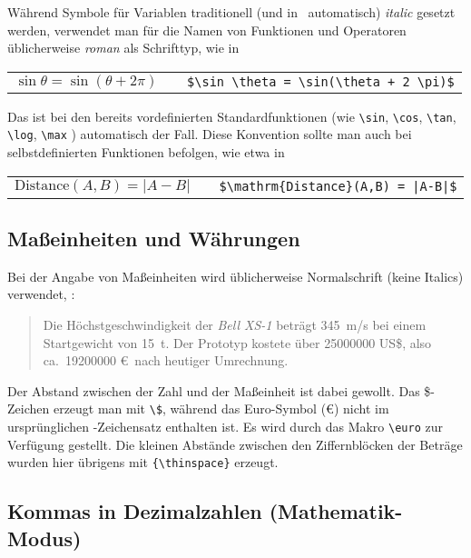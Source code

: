 Während Symbole für Variablen traditionell (und in \latex\ automatisch) \emph{italic} gesetzt werden,
verwendet man für die Namen von Funktionen und Operatoren üblicherweise
\emph{roman} als Schrifttyp, wie \zB in
\begin{center}
\begin{tabular}{lcl}
$\sin \theta = \sin(\theta + 2 \pi)$ & & \verb!$\sin \theta = \sin(\theta + 2 \pi)$! \\
\end{tabular}
\end{center}
Das ist bei den bereits vordefinierten Standardfunktionen (wie
\verb!\sin!,
\verb!\cos!,
\verb!\tan!,
\verb!\log!,
\verb!\max!
\uva) automatisch der Fall.
Diese Konvention sollte man auch bei selbstdefinierten Funktionen befolgen,
wie etwa in
\begin{center}
\begin{tabular}{lcl}
$\mathrm{Distance}(A,B) = |A-B|$ & & \verb!$\mathrm{Distance}(A,B) = |A-B|$! \\
\end{tabular}
\end{center}


\subsection{Maßeinheiten und Währungen}

Bei der Angabe von Maßeinheiten wird üblicherweise Normalschrift
(keine Italics) verwendet, \zB:
\begin{quote}
Die Höchstgeschwindigkeit der \textit{Bell XS-1} beträgt 345~m/s
bei einem Startgewicht von 15~t. 
Der Prototyp kostete über 25{\thinspace}000{\thinspace}000 US\$, also ca.\ 19{\thinspace}200{\thinspace}000 \euro\ nach heutiger Umrechnung.
\end{quote}
Der Abstand zwischen der Zahl und der Maßeinheit ist dabei
gewollt.
Das \$-Zeichen erzeugt man mit \verb!\$!, während
das Euro-Symbol (\euro) nicht im ursprünglichen \latex-Zeichensatz enthalten ist. Es wird 
durch das Makro \verb!\euro! %
zur Verfügung gestellt.
Die kleinen Abstände zwischen den Ziffernblöcken der Beträge wurden hier übrigens mit \verb!{\thinspace}! erzeugt.



\subsection{Kommas in Dezimalzahlen (Mathematik-Modus)}

